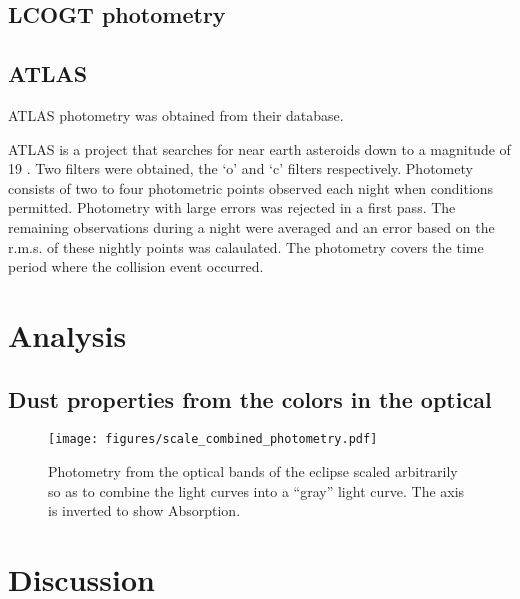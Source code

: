\documentclass{aa}
\begin{document}
\subsection{LCOGT photometry}

\subsection{ATLAS}

ATLAS photometry was obtained from their database.



ATLAS is a project that searches for near earth asteroids down to a magnitude of 19 
\citep{Tonry18}.
%
Two filters were obtained, the `o' and `c' filters respectively.
%
Photomety consists of two to four photometric points observed each night when conditions permitted.
%
Photometry with large errors was rejected in a first pass.
%
The remaining observations during a night were averaged and an error based on the r.m.s. of these nightly points was calaulated.
%
The photometry covers the time period where the collision event occurred. 


\section{Analysis}\label{sec:dustcloud}

\subsection{Dust properties from the colors in the optical}



\begin{figure*}
   \begin{centering}
   \texttt{[image: figures/scale\_combined\_photometry.pdf]}
      \caption{Photometry from the optical bands of the eclipse scaled arbitrarily so as to combine the light curves into a ``gray'' light curve.
      The axis is inverted to show Absorption.
              }
              \label{fig:allphot}
              \end{centering}
       \end{figure*}



\section{Discussion}\label{sec:discussion}
\end{document}
